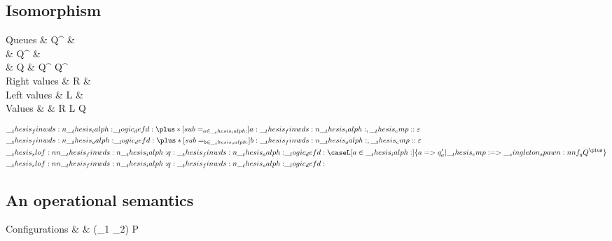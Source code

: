 \subsection{Isomorphism}

\begin{syntax*}
  Q{}ueues & Q^{\plus} & \selectR{\kay} \mid {} \\
           & Q^{\with} & \selectL{\kay} \mid {} \\
           & Q         & Q^{\with} \mid Q^{\plus} \mid {} \mid {} \\
  Right values & R &  \mid {} \\
   Left values & L &  \mid {} \\
        Values & \enspace\; & R \mid L \mid Q \mid \fwd
\end{syntax*}

\begin{equation*}
  \begin{lgathered}
    \finwds{\ialph} \defd \plus*[sub=_{a \in \ialph}]{a:\finwds{\ialph}, \emp:\varepsilon} \\
    \finwds{\oalph} \defd \plus*[sub=_{b \in \oalph}]{b:\finwds{\oalph}, \emp:\varepsilon} \\
    \slof{\finwds{\ialph} |- q : \finwds{\oalph}}
      \defd \caseL[a \in \ialph]{a => q'_a | \emp => \spawn{f_q}{Q^{\plus}}} \\
    \slof{\finwds{\ialph} |- q : \finwds{\oalph}}
      \defd 
  \end{lgathered}
\end{equation*}

\subsection{An operational semantics}

\begin{syntax*}
  Configurations &
    \cnf & \cnfe \mid (\cnf_1 \cc \cnf_2) \mid P
\end{syntax*}


